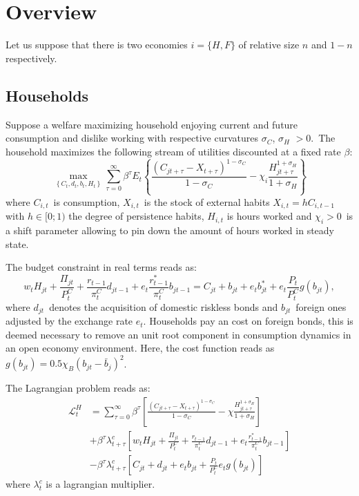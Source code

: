 \documentclass[a4paper,12pt]{article}%
\begin{document}
\FRONTPAGE


\section{Overview}

Let us suppose that there is two economies $i=\{H,F\}$ of relative size $n$
and $1-n$ respectively.

\subsection{Households}

Suppose a welfare maximizing household enjoying current and future consumption
and dislike working with respective curvatures $\sigma_{C}$, $\sigma_{H}$
$>0$.\ The household maximizes the following stream of utilities discounted at
a fixed rate $\beta$:%
\begin{equation}
\max_{\left\{  C_{t},d_{t},b_{t},H_{t}\right\}  }\sum_{\tau=0}^{\infty}%
\beta^{\tau}E_{t}\left\{  \frac{\left(  C_{jt+\tau}-X_{t+\tau}\right)
^{1-\sigma_{C}}}{1-\sigma_{C}}-\chi_{i}\frac{H_{jt+\tau}^{1+\sigma_{H}}%
}{1+\sigma_{H}}\right\}
\end{equation}
where $C_{i,t}$\ is consumption, $X_{i,t}$\ is the stock of external habits
$X_{i,t}=hC_{i,t-1}$ with $h\in\lbrack0;1)$ the degree of persistence habits,
$H_{i,t}$ is hours worked and $\chi_{i}>0$\ is a shift parameter allowing to
pin down the amount of hours worked in steady state.

The budget constraint in real terms reads as:%
\begin{equation}
w_{t}H_{jt}+\frac{\Pi_{jt}}{P_{t}^{C}}+\frac{r_{t-1}}{\pi_{t}^{C}}%
d_{jt-1}+e_{t}\frac{r_{t-1}^{\ast}}{\pi_{t}^{C}}b_{jt-1}=C_{jt}+b_{jt}%
+e_{t}b_{jt}^{\ast}+e_{t}\frac{P_{t}}{P_{t}^{C}}g\left(  b_{jt}\right)  ,
\end{equation}
where $d_{jt}$\ denotes the acquisition of domestic riskless bonds and
$b_{jt}$\ foreign ones adjusted by the exchange rate $e_{t}$. Households pay
an cost on foreign bonds, this is deemed necessary to remove an unit root
component in consumption dynamics in an open economy environment. Here, the
cost function reads as $g\left(  b_{jt}\right)  =0.5\chi_{B}\left(
b_{jt}-\bar{b}_{j}\right)  ^{2}$.

The Lagrangian problem reads as:%
\begin{align*}
\mathcal{L}_{t}^{H} &  =\sum_{\tau=0}^{\infty}\beta^{\tau}\left[
\frac{\left(  C_{jt+\tau}-X_{t+\tau}\right)  ^{1-\sigma_{C}}}{1-\sigma_{C}%
}-\chi\frac{H_{jt+\tau}^{1+\sigma_{H}}}{1+\sigma_{H}}\right]  \\
&  +\beta^{\tau}\lambda_{t+\tau}^{c}\left[  w_{t}H_{jt}+\frac{\Pi_{jt}}%
{P_{t}^{C}}+\frac{r_{t-1}}{\pi_{t}^{C}}d_{jt-1}+e_{t}\frac{r_{t-1}^{\ast}}%
{\pi_{t}^{C}}b_{jt-1}\right]  \\
&  -\beta^{\tau}\lambda_{t+\tau}^{c}\left[  C_{jt}+d_{jt}+e_{t}b_{jt}%
+\frac{P_{t}}{P_{t}^{C}}e_{t}g\left(  b_{jt}\right)  \right]
\end{align*}
where $\lambda_{t}^{c}$ is a lagrangian multiplier.
\end{document}
